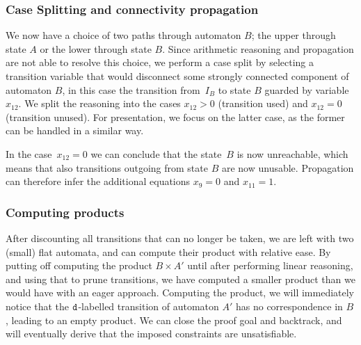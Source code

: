 
\subsubsection{Case Splitting and connectivity propagation}\label{sec:intuition:split}
We now have a choice of two paths through automaton $B$; the
upper through state $A$ or the lower through state $B$. Since
arithmetic reasoning and propagation are not able to resolve this choice,
we perform a case split by selecting a transition variable that would disconnect
some strongly connected component of automaton $B$, in this case the transition
from~$I_B$ to state $B$ guarded by variable~$x_{12}$.
 We split the reasoning into the cases $x_{12} > 0$ (transition used)
and $x_{12} = 0$ (transition unused). For presentation, we focus
on the latter case, as the former can be handled in a similar way.

In the case~$x_{12} = 0$ we can conclude
that the state~$B$ is now unreachable, which means that also
transitions outgoing from state $B$ are now unusable. Propagation can
therefore infer the additional equations $x_9 = 0$ and $x_{11} = 1$.


\subsubsection{Computing products}\label{sec:intuition:materialise}
After discounting all transitions that can no longer be taken, we are
left with two (small) flat automata, and can compute their product with
relative ease. By putting off computing the product $B \times A'$ until after
performing linear reasoning, and using that to prune transitions, we
have computed a smaller product than we would have with an eager
approach. Computing the product, we will immediately notice that the
$\texttt{d}$-labelled transition of automaton $A'$ has no correspondence
in $B$, leading to an empty product. We can close the proof goal and
backtrack, and will eventually derive that the imposed constraints are
unsatisfiable.

